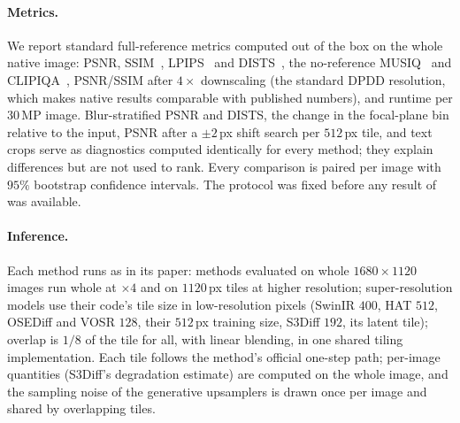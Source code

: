 \paragraph{Metrics.} We report standard full-reference metrics computed out of the box on the whole
native image: PSNR, SSIM~\cite{wang2004ssim}, LPIPS~\cite{zhang2018lpips} and DISTS~\cite{ding2020dists},
the no-reference MUSIQ~\cite{ke2021musiq} and CLIPIQA~\cite{wang2023clipiqa}, PSNR/SSIM after $4\times$
downscaling (the standard DPDD resolution, which makes native results comparable with published
numbers), and runtime per $30$\,MP image. Blur-stratified PSNR and DISTS, the change in the focal-plane
bin relative to the input, PSNR after a $\pm2$\,px shift search per $512$\,px tile, and text crops serve
as diagnostics computed identically for every method; they explain differences but are not used to
rank. Every comparison is paired per image with $95\%$ bootstrap confidence intervals. The protocol
was fixed before any result of \method was available.
\paragraph{Inference.} Each method runs as in its paper: methods evaluated on whole $1680\times1120$
images run whole at $\times4$ and on $1120$\,px tiles at higher resolution; super-resolution models
use their code's tile size in low-resolution pixels (SwinIR $400$, HAT $512$, OSEDiff and VOSR $128$, \ie
their $512$\,px training size, S3Diff $192$, its latent tile); overlap is $1/8$ of the tile for all, with
linear blending, in one shared tiling implementation. Each tile follows the method's official one-step
path; per-image quantities (S3Diff's degradation estimate) are computed on the whole image, and the
sampling noise of the generative upsamplers is drawn once per image and shared by overlapping tiles.

